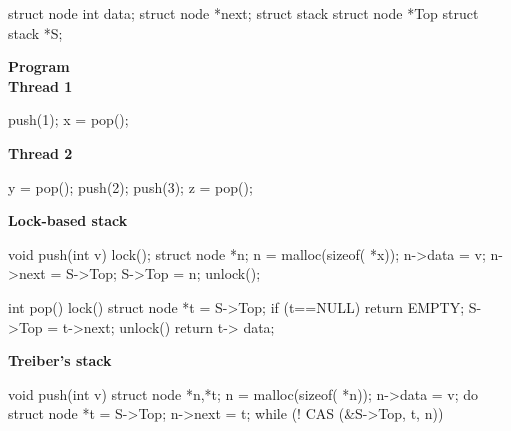 \begin{figure*}[t]
  \lstset{numbers=left, 
          numberstyle=\tiny\tt, 
          stepnumber=1, 
          firstnumber=1,
          numbersep=4pt}
  \footnotesize
  \centering
  \begin{minipage}[b]{38mm}
    \begin{program}
struct node {
  int data;
  struct node *next;
}
struct stack {
  struct node *Top
}
struct stack *S;
    \end{program}
    \bigskip
    \lstset{numbers=none}
    \begin{minipage}[b]{17mm}
      \textbf{Program} \\[1em]
      \textbf{Thread 1}
      \begin{program}
push(1);
x = pop();
      \end{program}
    \end{minipage}
    \begin{minipage}[b]{16mm}
      \textbf{Thread 2}
      \begin{program}
y = pop();
push(2);
push(3);
z = pop();
      \end{program}
    \end{minipage}
  \end{minipage}
  \begin{minipage}[b]{44mm}
    \textbf{Lock-based stack}
    \begin{program}
void push(int v) {
  lock();
  struct node *n;
  n = malloc(sizeof( *x));
  n->data = v;
  n->next = S->Top;
  S->Top = n;
  unlock();
}

int pop() {
  lock()
  struct node *t = S->Top;
  if (t==NULL)
    return EMPTY;
  S->Top = t->next;
  unlock()
  return t-> data;
}
    \end{program}
  \end{minipage}
  \begin{minipage}[b]{50mm}
    \textbf{Treiber's stack}
    \begin{program}
void push(int v) {
  struct node *n,*t;
  n = malloc(sizeof( *n));
  n->data = v;
  do {
    struct node *t = S->Top;
    n->next = t;
  } while (! CAS (&S->Top, t, n))
}


\end{program}
\end{minipage}
\end{figure*}
